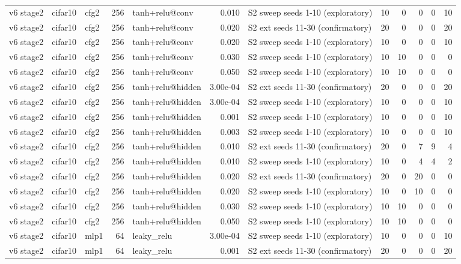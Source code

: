 \begin{table}[htbp]
{\begin{tabular}{@{}lllrlrlrrrrr@{}}
v6 stage2 & cifar10 & cfg2 & 256 & tanh+relu@conv & 0.010 & S2 sweep seeds 1-10 (exploratory) & 10 & 0 & 0 & 0 & 10 \\
v6 stage2 & cifar10 & cfg2 & 256 & tanh+relu@conv & 0.020 & S2 ext seeds 11-30 (confirmatory) & 20 & 0 & 0 & 0 & 20 \\
v6 stage2 & cifar10 & cfg2 & 256 & tanh+relu@conv & 0.020 & S2 sweep seeds 1-10 (exploratory) & 10 & 0 & 0 & 0 & 10 \\
v6 stage2 & cifar10 & cfg2 & 256 & tanh+relu@conv & 0.030 & S2 sweep seeds 1-10 (exploratory) & 10 & 10 & 0 & 0 & 0 \\
v6 stage2 & cifar10 & cfg2 & 256 & tanh+relu@conv & 0.050 & S2 sweep seeds 1-10 (exploratory) & 10 & 10 & 0 & 0 & 0 \\
v6 stage2 & cifar10 & cfg2 & 256 & tanh+relu@hidden & 3.00e-04 & S2 ext seeds 11-30 (confirmatory) & 20 & 0 & 0 & 0 & 20 \\
v6 stage2 & cifar10 & cfg2 & 256 & tanh+relu@hidden & 3.00e-04 & S2 sweep seeds 1-10 (exploratory) & 10 & 0 & 0 & 0 & 10 \\
v6 stage2 & cifar10 & cfg2 & 256 & tanh+relu@hidden & 0.001 & S2 sweep seeds 1-10 (exploratory) & 10 & 0 & 0 & 0 & 10 \\
v6 stage2 & cifar10 & cfg2 & 256 & tanh+relu@hidden & 0.003 & S2 sweep seeds 1-10 (exploratory) & 10 & 0 & 0 & 0 & 10 \\
v6 stage2 & cifar10 & cfg2 & 256 & tanh+relu@hidden & 0.010 & S2 ext seeds 11-30 (confirmatory) & 20 & 0 & 7 & 9 & 4 \\
v6 stage2 & cifar10 & cfg2 & 256 & tanh+relu@hidden & 0.010 & S2 sweep seeds 1-10 (exploratory) & 10 & 0 & 4 & 4 & 2 \\
v6 stage2 & cifar10 & cfg2 & 256 & tanh+relu@hidden & 0.020 & S2 ext seeds 11-30 (confirmatory) & 20 & 0 & 20 & 0 & 0 \\
v6 stage2 & cifar10 & cfg2 & 256 & tanh+relu@hidden & 0.020 & S2 sweep seeds 1-10 (exploratory) & 10 & 0 & 10 & 0 & 0 \\
v6 stage2 & cifar10 & cfg2 & 256 & tanh+relu@hidden & 0.030 & S2 sweep seeds 1-10 (exploratory) & 10 & 10 & 0 & 0 & 0 \\
v6 stage2 & cifar10 & cfg2 & 256 & tanh+relu@hidden & 0.050 & S2 sweep seeds 1-10 (exploratory) & 10 & 10 & 0 & 0 & 0 \\
v6 stage2 & cifar10 & mlp1 & 64 & leaky\_relu & 3.00e-04 & S2 sweep seeds 1-10 (exploratory) & 10 & 0 & 0 & 0 & 10 \\
v6 stage2 & cifar10 & mlp1 & 64 & leaky\_relu & 0.001 & S2 ext seeds 11-30 (confirmatory) & 20 & 0 & 0 & 0 & 20 \\

\end{tabular}}
\end{table}

